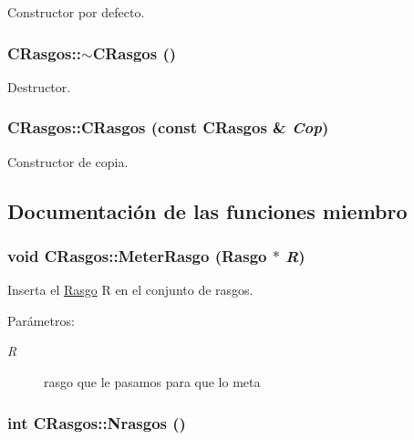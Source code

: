 Constructor por defecto. 

\hypertarget{class_c_rasgos_acd1dea2f1da5efa4f7b066712913940}{
\subsubsection[{$\sim$CRasgos}]{\setlength{\rightskip}{0pt plus 5cm}CRasgos::$\sim$CRasgos ()}}
\label{class_c_rasgos_acd1dea2f1da5efa4f7b066712913940}


Destructor. 

\hypertarget{class_c_rasgos_2d9e8f84bc7339fc3ffe38cb770910ea}{
\subsubsection[{CRasgos}]{\setlength{\rightskip}{0pt plus 5cm}CRasgos::CRasgos (const {\bf CRasgos} \& {\em Cop})}}
\label{class_c_rasgos_2d9e8f84bc7339fc3ffe38cb770910ea}


Constructor de copia. 



\subsection{Documentación de las funciones miembro}
\hypertarget{class_c_rasgos_3af493672124ac9d4b94271c9004bda2}{
\subsubsection[{MeterRasgo}]{\setlength{\rightskip}{0pt plus 5cm}void CRasgos::MeterRasgo ({\bf Rasgo} $\ast$ {\em R})}}
\label{class_c_rasgos_3af493672124ac9d4b94271c9004bda2}


Inserta el \hyperlink{class_rasgo}{Rasgo} R en el conjunto de rasgos. 

\begin{Desc}
\item[Parámetros:]
\begin{description}
\item[{\em R}]rasgo que le pasamos para que lo meta \end{description}
\end{Desc}
\hypertarget{class_c_rasgos_80199d2461b16fbba188ad696105257d}{
\subsubsection[{Nrasgos}]{\setlength{\rightskip}{0pt plus 5cm}int CRasgos::Nrasgos ()}}
\label{class_c_rasgos_80199d2461b16fbba188ad696105257d}


